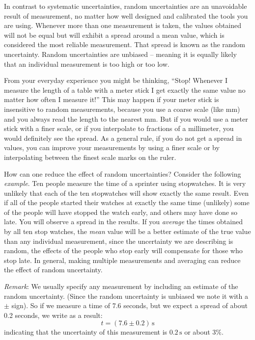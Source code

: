 \documentclass[letterpaper, 12pt]{book}
\newcommand{\myskip}{\vspace{0.5\baselineskip}}
\begin{document}
In contrast to systematic uncertainties, random uncertainties are an unavoidable result of measurement, no matter how well designed and calibrated the tools you are using. Whenever more than one measurement is taken, the values obtained will not be equal but will exhibit a spread around a mean value, which is considered the most reliable measurement. That spread is known as the random uncertainty. Random uncertainties are unbiased -- meaning it is equally likely that an individual measurement is too high or too low. \myskip

From your everyday experience you might be thinking, ``Stop! Whenever I measure the length of a table with a meter stick I get exactly the same value no matter how often I measure it!''   This may happen if your meter stick is insensitive to random measurements, because you use a coarse scale (like $\mathrm{mm}$) and you always read the length to the nearest $\mathrm{mm}$. But if you would use a meter stick with a finer scale, or if you interpolate to fractions of a millimeter, you would definitely see the spread. As a general rule, if you do not get a spread in values, you can improve your measurements by using a finer scale or by interpolating between the finest scale marks on the ruler. \myskip

How can one reduce the effect of random uncertainties?  Consider the following \emph{example}. Ten people measure the time of a sprinter using stopwatches. It is very unlikely that each of the ten stopwatches will show exactly the same result. Even if all of the people started their watches at exactly the same time (unlikely) some of the people will have stopped the watch early, and others may have done so late. You will observe a spread in the results. If you \emph{average} the times obtained by all ten stop watches, the \emph{mean} value will be a better estimate of the true value than any individual measurement, since the uncertainty we are describing is random, the effects of the people who stop early will compensate for those who stop late. In general, making multiple measurements and averaging can reduce the effect of random uncertainty. \myskip

\emph{Remark}: We usually specify any measurement by including an estimate of the random uncertainty. (Since the random uncertainty is unbiased we note it with a $\pm$ sign). So if we measure a time of 7.6 seconds, but we expect a spread of about 0.2 seconds, we write as a result:
\begin{equation}
    t = (7.6\pm 0.2)\,\mathrm{s}
\end{equation}
indicating that the uncertainty of this measurement is $0.2\,\mathrm{s}$ or about $3\%$. \myskip
\end{document}
